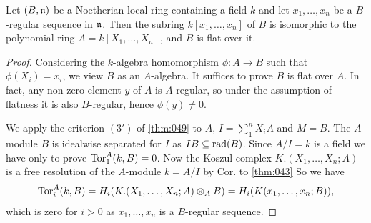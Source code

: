 \documentclass[../main]{subfiles}
\begin{document}
\begin{parapplication}[Hartshorne] Let $(B,\mathfrak{n})$ be a Noetherian local ring containing a field $k$ and let $x_1, \dots, x_n$ be a $B$-regular sequence in $\mathfrak{n}$. Then the subring $k[x_1,\dots,x_n]$ of $B$ is isomorphic to the polynomial ring $A = k[X_1,\dots,X_n]$, and $B$ is flat over it.
\end{parapplication}
\begin{proof}
Considering the $k$-algebra homomorphism $\phi\colon A\longrightarrow B$ such that $\phi(X_i) = x_i$, we view $B$ as an $A$-algebra. It suffices to prove $B$ is flat over $A$. In fact, any non-zero element $y$ of $A$ is $A$-regular, so under the assumption of flatness it is also $B$-regular, hence $\phi(y)\neq 0$.

We apply the criterion $(3')$ of \ref{thm:049} to $A$, $I = \sum_1^n X_iA$ and $M = B$. The $A$-module $B$ is idealwise separated for $I$ as $IB\subseteq \operatorname{rad}(B)$. Since $A/I = k$ is a field we have only to prove $\operatorname{Tor}_1^A(k,B) = 0$. Now the Koszul complex $K.(X_1,\dots,X_n;A)$ is a free resolution of the $A$-module $k = A/I$ by Cor. to \ref{thm:043} So we have \[\operatorname{Tor}_i^A(k,B) = H_i(K.(X_1,\dots,X_n;A)\otimes_A B)= H_i(K(x_1,\dots,x_n;B)),\] which is zero for $i>0$ as $x_1,\dots,x_n$ is a $B$-regular sequence.
\end{proof}
\end{document}
